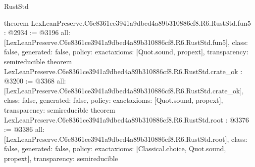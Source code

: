 \begin{lexlean}{RustStd}
\begin{coremodule}
{}
theorem LexLeanPreserve.C6e8361ce3941a9dbed4a89b310886cf8.R6.RustStd.fun5 : @2934 := @3196 {
  all: [LexLeanPreserve.C6e8361ce3941a9dbed4a89b310886cf8.R6.RustStd.fun5],
  class: false,
  generated: false,
  policy: exact{axioms: [Quot.sound, propext]},
  transparency: semireducible
}
theorem LexLeanPreserve.C6e8361ce3941a9dbed4a89b310886cf8.R6.RustStd.crate_ok : @3200 := @3368 {
  all: [LexLeanPreserve.C6e8361ce3941a9dbed4a89b310886cf8.R6.RustStd.crate_ok],
  class: false,
  generated: false,
  policy: exact{axioms: [Quot.sound, propext]},
  transparency: semireducible
}
theorem LexLeanPreserve.C6e8361ce3941a9dbed4a89b310886cf8.R6.RustStd.root : @3376 := @3386 {
  all: [LexLeanPreserve.C6e8361ce3941a9dbed4a89b310886cf8.R6.RustStd.root],
  class: false,
  generated: false,
  policy: exact{axioms: [Classical.choice, Quot.sound, propext]},
  transparency: semireducible
}


\end{coremodule}
\end{lexlean}
